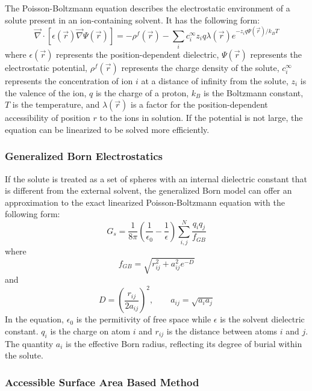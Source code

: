 \documentclass[11pt]{report}
\begin{document}
The Poisson-Boltzmann equation describes
the electrostatic environment of a solute present in
an ion-containing solvent. It has the following 
form:
\begin{equation}
    \vec{\nabla}\cdot\left[\epsilon(\vec{r})\vec{\nabla}\Psi(\vec{r})\right] = -\rho^{f}(\vec{r}) - \sum_{i}c_{i}^{\infty}z_{i}q\lambda(\vec{r})e^{-z_{i}q\Psi(\vec{r})/k_BT} 
\end{equation}
where $\epsilon(\vec{r})$ represents the position-dependent dielectric, $\Psi(\vec{r})$ represents the electrostatic potential, $\rho^{f}(\vec{r})$ represents the charge density of the solute, $c_{i}^{\infty}$ represents the concentration of ion $i$ at a distance of infinity from the solute, $z_{i}$ is the valence of the ion, $q$ is the charge of a proton, $k_B$ is the Boltzmann constant, $T$ is the temperature, and $\lambda(\vec{r})$ is a factor for the position-dependent accessibility of position $r$ to the ions in solution. If the potential is not large, the equation can be linearized to be solved more efficiently.

\subsubsection{Generalized Born Electrostatics}

If the solute is treated as a set of spheres with 
an internal dielectric constant that is different from the 
external solvent, the generalized Born model
can offer an approximation to the exact linearized 
Poisson-Boltzmann equation with the following form:
\begin{equation}
    G_{s} = \frac{1}{8\pi}\left(\frac{1}{\epsilon_{0}}-\frac{1}{\epsilon}\right)\sum_{i,j}^{N}\frac{q_{i}q_{j}}{f_{GB}} 
\end{equation}
where
\begin{equation}
f_{GB} = \sqrt{r_{ij}^{2} + a_{ij}^{2}e^{-D}}
\end{equation}
and
\begin{equation}
 D = \left(\frac{r_{ij}}{2a_{ij}}\right)^{2}, \qquad a_{ij} = \sqrt{a_{i}a_{j}} 
\end{equation}
In the equation, $\epsilon_0$ is the permitivity of 
free space while $\epsilon$ is the solvent dielectric constant.
$q_i$ is the charge on atom $i$ and $r_{ij}$ is the distance
between atoms $i$ and $j$. The quantity $a_i$ is the effective
Born radius, reflecting its degree of burial within the
solute.

\subsubsection{Accessible Surface Area Based Method}
\end{document}
